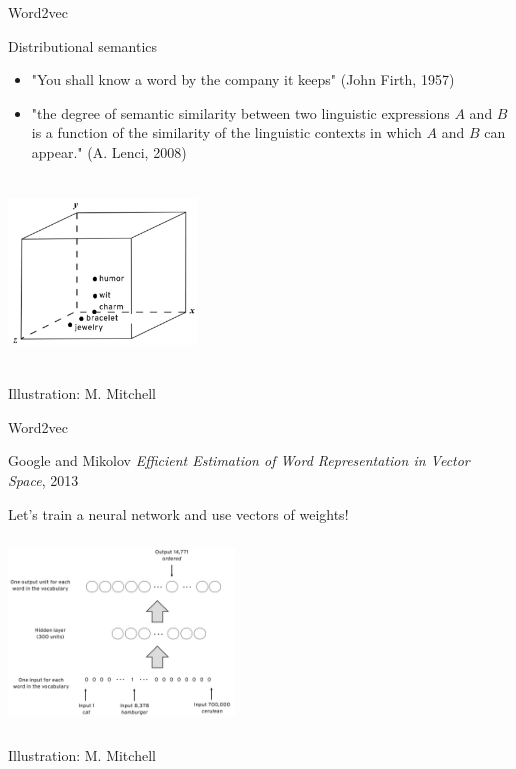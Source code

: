 \documentclass[
  10pt,
  ignorenonframetext,
  x11names, dvipsnames, bibspacing,natbib, table]{beamer}
\begin{document}
\begin{frame}{Word2vec}
\protect\hypertarget{word2vec-4}{}
\begin{block}{Distributional semantics}
\protect\hypertarget{distributional-semantics}{}
\begin{itemize}
\item "You shall know a word by the company it keeps" (John Firth, 1957)


\item "the degree of semantic similarity between two linguistic expressions $A$ and $B$ is a function of the similarity of the linguistic contexts in which $A$ and $B$ can appear." (A. Lenci, 2008)


\end{itemize}

\pause

\begin{center}
 \includegraphics[height = 5cm, width = 5cm]{images/similarity1.png}
\end{center}

\vspace{-3mm}

\tiny \hfill \color{gray}Illustration: M. Mitchell \color{black}
\end{block}
\end{frame}

\begin{frame}{Word2vec}
\protect\hypertarget{word2vec-5}{}
\begin{block}{Google and Mikolov}
\protect\hypertarget{google-and-mikolov}{}
\emph{Efficient Estimation of Word Representation in Vector Space}, 2013

Let's train a neural network and use vectors of weights!

\begin{center}
 \includegraphics[height = 5cm, width = 6cm]{images/word2vec1.png}
\end{center}

\vspace{-3mm}

\tiny \hfill \color{gray}Illustration: M. Mitchell \color{black}
\end{block}
\end{frame}
\end{document}
